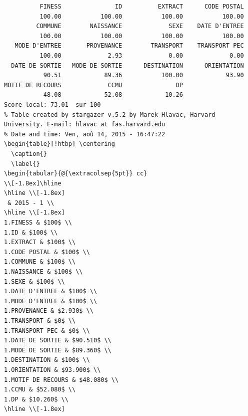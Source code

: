\documentclass[]{article}
\begin{document}
\begin{verbatim}
          FINESS               ID          EXTRACT      CODE POSTAL 
          100.00           100.00           100.00           100.00 
         COMMUNE        NAISSANCE             SEXE    DATE D'ENTREE 
          100.00           100.00           100.00           100.00 
   MODE D'ENTREE       PROVENANCE        TRANSPORT    TRANSPORT PEC 
          100.00             2.93             0.00             0.00 
  DATE DE SORTIE   MODE DE SORTIE      DESTINATION      ORIENTATION 
           90.51            89.36           100.00            93.90 
MOTIF DE RECOURS             CCMU               DP 
           48.08            52.08            10.26 
Score local: 73.01  sur 100
% Table created by stargazer v.5.2 by Marek Hlavac, Harvard University. E-mail: hlavac at fas.harvard.edu
% Date and time: Ven, aoû 14, 2015 - 16:47:22
\begin{table}[!htbp] \centering 
  \caption{} 
  \label{} 
\begin{tabular}{@{\extracolsep{5pt}} cc} 
\\[-1.8ex]\hline 
\hline \\[-1.8ex] 
 & 2015 - 1 \\ 
\hline \\[-1.8ex] 
1.FINESS & $100$ \\ 
1.ID & $100$ \\ 
1.EXTRACT & $100$ \\ 
1.CODE POSTAL & $100$ \\ 
1.COMMUNE & $100$ \\ 
1.NAISSANCE & $100$ \\ 
1.SEXE & $100$ \\ 
1.DATE D'ENTREE & $100$ \\ 
1.MODE D'ENTREE & $100$ \\ 
1.PROVENANCE & $2.930$ \\ 
1.TRANSPORT & $0$ \\ 
1.TRANSPORT PEC & $0$ \\ 
1.DATE DE SORTIE & $90.510$ \\ 
1.MODE DE SORTIE & $89.360$ \\ 
1.DESTINATION & $100$ \\ 
1.ORIENTATION & $93.900$ \\ 
1.MOTIF DE RECOURS & $48.080$ \\ 
1.CCMU & $52.080$ \\ 
1.DP & $10.260$ \\ 
\hline \\[-1.8ex] 

\end{verbatim}
\end{document}
